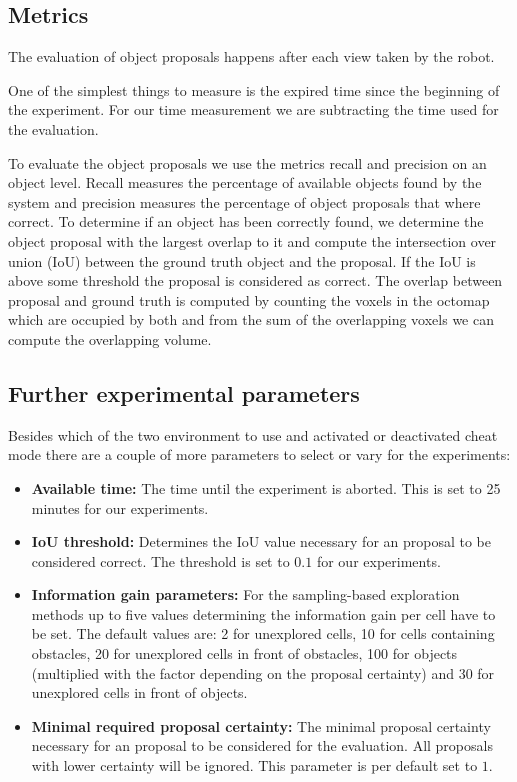 \documentclass[a4paper,11pt,english]{article}
\begin{document}
\subsection{Metrics}
The evaluation of object proposals happens after each view taken by the robot.

One of the simplest things to measure is the expired time since the beginning of the experiment.
For our time measurement we are subtracting the time used for the evaluation.

To evaluate the object proposals we use the metrics recall and precision on an object level.
Recall measures the percentage of available objects found by the system and precision measures the percentage of object proposals that where correct.
To determine if an object has been correctly found, we determine the object proposal with the largest overlap to it and compute the intersection over union (IoU) between the ground truth object and the proposal.
If the IoU is above some threshold the proposal is considered as correct.
The overlap between proposal and ground truth is computed by counting the voxels in the octomap which are occupied by both and from the sum of the overlapping voxels we can compute the overlapping volume.

\subsection{Further experimental parameters}
Besides which of the two environment to use and activated or deactivated cheat mode there are a couple of more parameters to select or vary for the experiments:

\begin{itemize}
	\item \textbf{Available time:} The time until the experiment is aborted. This is set to 25 minutes for our experiments.
	\item \textbf{IoU threshold:} Determines the IoU value necessary for an proposal to be considered correct. The threshold is set to $0.1$ for our experiments.
	\item \textbf{Information gain parameters:} For the sampling-based exploration methods up to five values determining the information gain per cell have to be set. The default values are: 2 for unexplored cells, 10 for cells containing obstacles, 20 for unexplored cells in front of obstacles, 100 for objects (multiplied with the factor depending on the proposal certainty) and 30 for unexplored cells in front of objects.
	\item \textbf{Minimal required proposal certainty:} The minimal proposal certainty necessary for an proposal to be considered for the evaluation. All proposals with lower certainty will be ignored. This parameter is per default set to $1$.
\end{itemize}
\end{document}
